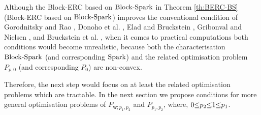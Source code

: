 \begin{remark}
\label{rmrk:BSpark-intractable} 
Although the Block-ERC based on $\mathrm{Block\text{{-}}Spark}$ in Theorem \ref{th:BERC-BS} (Block-ERC based on $\mathrm{Block\text{{-}}Spark}$) improves the conventional condition of Gorodnitsky and Rao \cite{Gorodnitsky1997}, Donoho et al. \cite{Donoho1989,Donoho2001,Donoho2003,Donoho2003a}, Elad and Bruckstein \cite{Elad2001,Elad2002a}, Gribonval and Nielsen \cite{Gribonval2003a,Gribonval2003}, and Bruckstein et al. \cite{Bruckstein2009}, when it comes to practical computations both conditions would become unrealistic, because both the characterisation $\mathrm{Block\text{{-}}Spark}$ (and corresponding $\mathrm{Spark}$) and the related optimisation problem $P_{p,0}$ (and corresponding $P_{0}$) are non-convex.

Therefore, the next step would focus on at least the related optimisation problems which are tractable.
In the next section we propose conditions for more general optimisation problems of $P_{\boldsymbol{w};p_1,p_2}$ and $P_{p_1,p_2}$, where, $0 {\leq} p_2 {\leq} 1 {\leq} p_1$.
\end{remark}